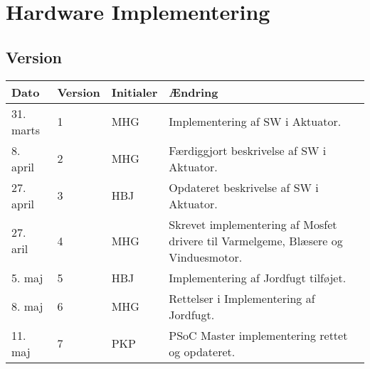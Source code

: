 \chapter{Hardware Implementering} \label{ch:HwImpl}

\section{Version}
\begin{table}[h]
	\centering
	\begin{tabularx}{\textwidth - 2cm}{|l|l|l|X|}
	\hline
	Dato	& Version	& Initialer & Ændring	\\ \hline
	31. marts & 1 & MHG & Implementering af SW i Aktuator. \\ \hline
	8. april & 2 & MHG & Færdiggjort beskrivelse af SW i Aktuator. \\\hline
	27. april & 3 & HBJ & Opdateret beskrivelse af SW i Aktuator. \\\hline
	27. aril & 4 & MHG & Skrevet implementering af Mosfet drivere til Varmelgeme, Blæsere og Vinduesmotor. \\\hline
	5. maj & 5 & HBJ & Implementering af Jordfugt tilføjet. \\\hline
	8. maj & 6 & MHG & Rettelser i Implementering af Jordfugt. \\\hline
	11. maj & 7 & PKP & PSoC Master implementering rettet og opdateret. \\\hline
	\end{tabularx}
\end{table}




